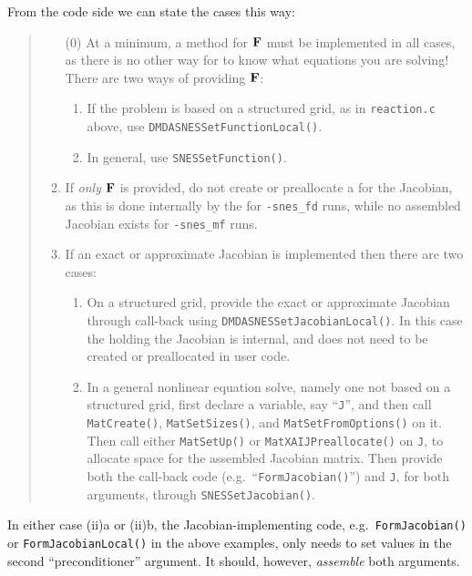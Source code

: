 From the code side we can state the cases this way:
\begin{quote}
\renewcommand{\labelenumi}{(\roman{enumi})}
\begin{enumerate}
\item[($0$)] At a minimum, a method for $\mathbf{F}$ must be implemented in all cases, as there is no other way for \PETSc to know what equations you are solving!  There are two ways of providing $\mathbf{F}$:
  \renewcommand{\labelenumii}{\alph{enumii}.}
   \begin{enumerate}
   \item If the problem is based on a structured grid, as in \texttt{reaction.c} above, use \texttt{DMDASNESSetFunctionLocal()}.
   \item In general, use \texttt{SNESSetFunction()}.
   \end{enumerate}
\item If \emph{only} $\mathbf{F}$ is provided, do not create or preallocate a \pMat for the Jacobian, as this is done internally by the \pSNES for \texttt{-snes\_fd} runs, while no assembled Jacobian \pMat exists for \texttt{-snes\_mf} runs.
\item If an exact or approximate Jacobian is implemented then there are two cases:
   \renewcommand{\labelenumii}{\alph{enumii}.}
   \begin{enumerate}
   \item On a structured grid, provide the exact or approximate Jacobian through call-back using \texttt{DMDASNESSetJacobianLocal()}.  In this case the \pMat holding the Jacobian is internal, and does not need to be created or preallocated in user code.
   \item In a general nonlinear equation solve, namely one not based on a structured grid, first declare a \pMat variable, say ``\texttt{J}'', and then call \texttt{MatCreate()}, \texttt{MatSetSizes()}, and \texttt{MatSetFromOptions()} on it.  Then call either \texttt{MatSetUp()} or \texttt{MatXAIJPreallocate()} on \texttt{J}, to allocate space for the assembled Jacobian matrix.  Then provide both the call-back code (e.g.~``\texttt{FormJacobian()}'') and \texttt{J}, for both \pMat arguments, through \texttt{SNESSetJacobian()}.
   \end{enumerate}
\end{enumerate}
\end{quote}

In either case (ii)a or (ii)b, the Jacobian-implementing code, e.g.~\texttt{FormJacobian()} or \texttt{FormJacobianLocal()} in the above examples, only needs to set values in the second ``preconditioner'' \pMat argument.  It should, however, \emph{assemble} both \pMat arguments.

